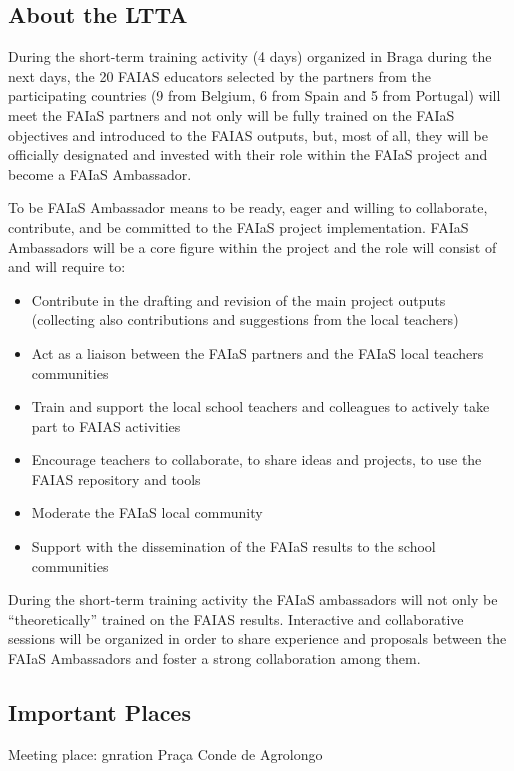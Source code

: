 \documentclass[11pt]{article}
\begin{document}
\subsection*{About the LTTA}

During the short-term training activity (4 days) organized in Braga during the next days, the 20 FAIAS educators selected by the partners from the participating countries (9 from Belgium, 6 from Spain and 5 from Portugal) will meet the FAIaS partners and not only will be fully trained on the FAIaS objectives and introduced to the FAIAS outputs, but, most of all, they will be officially designated and invested with their role within the FAIaS project and become a FAIaS Ambassador.

To be FAIaS Ambassador means to be ready, eager and willing to collaborate, contribute, and be committed to the FAIaS project implementation. FAIaS Ambassadors will be a core figure within the project and the role will consist of and will require to:
\begin{itemize}
    \item Contribute in the drafting and revision of the main project outputs (collecting also contributions and suggestions from the local teachers)
    \item Act as a liaison between the FAIaS partners and the FAIaS local teachers communities 
    \item Train and support the local school teachers and colleagues to actively take part to FAIAS activities
    \item Encourage teachers to collaborate, to share ideas and projects, to use the FAIAS repository and tools 
    \item Moderate the FAIaS local community 
    \item Support with the dissemination of the FAIaS results to the school communities
\end{itemize}

During the short-term training activity the FAIaS ambassadors will not only be “theoretically” trained on the FAIAS results. Interactive and collaborative sessions will be organized in order to share experience and proposals between the FAIaS Ambassadors and foster a strong collaboration among them.

\subsection*{Important Places}

Meeting place: 
gnration
Praça Conde de Agrolongo 
\end{document}
